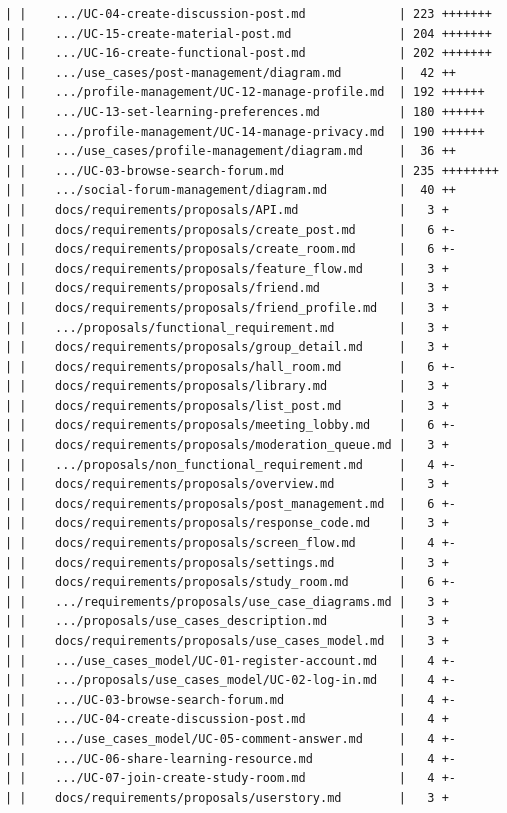 \documentclass[12pt]{article}
\begin{document}
\begin{lstlisting}[numbers=none,breaklines=true]
| |    .../UC-04-create-discussion-post.md             | 223 +++++++
| |    .../UC-15-create-material-post.md               | 204 +++++++
| |    .../UC-16-create-functional-post.md             | 202 +++++++
| |    .../use_cases/post-management/diagram.md        |  42 ++
| |    .../profile-management/UC-12-manage-profile.md  | 192 ++++++
| |    .../UC-13-set-learning-preferences.md           | 180 ++++++
| |    .../profile-management/UC-14-manage-privacy.md  | 190 ++++++
| |    .../use_cases/profile-management/diagram.md     |  36 ++
| |    .../UC-03-browse-search-forum.md                | 235 ++++++++
| |    .../social-forum-management/diagram.md          |  40 ++
| |    docs/requirements/proposals/API.md              |   3 +
| |    docs/requirements/proposals/create_post.md      |   6 +-
| |    docs/requirements/proposals/create_room.md      |   6 +-
| |    docs/requirements/proposals/feature_flow.md     |   3 +
| |    docs/requirements/proposals/friend.md           |   3 +
| |    docs/requirements/proposals/friend_profile.md   |   3 +
| |    .../proposals/functional_requirement.md         |   3 +
| |    docs/requirements/proposals/group_detail.md     |   3 +
| |    docs/requirements/proposals/hall_room.md        |   6 +-
| |    docs/requirements/proposals/library.md          |   3 +
| |    docs/requirements/proposals/list_post.md        |   3 +
| |    docs/requirements/proposals/meeting_lobby.md    |   6 +-
| |    docs/requirements/proposals/moderation_queue.md |   3 +
| |    .../proposals/non_functional_requirement.md     |   4 +-
| |    docs/requirements/proposals/overview.md         |   3 +
| |    docs/requirements/proposals/post_management.md  |   6 +-
| |    docs/requirements/proposals/response_code.md    |   3 +
| |    docs/requirements/proposals/screen_flow.md      |   4 +-
| |    docs/requirements/proposals/settings.md         |   3 +
| |    docs/requirements/proposals/study_room.md       |   6 +-
| |    .../requirements/proposals/use_case_diagrams.md |   3 +
| |    .../proposals/use_cases_description.md          |   3 +
| |    docs/requirements/proposals/use_cases_model.md  |   3 +
| |    .../use_cases_model/UC-01-register-account.md   |   4 +-
| |    .../proposals/use_cases_model/UC-02-log-in.md   |   4 +-
| |    .../UC-03-browse-search-forum.md                |   4 +-
| |    .../UC-04-create-discussion-post.md             |   4 +
| |    .../use_cases_model/UC-05-comment-answer.md     |   4 +-
| |    .../UC-06-share-learning-resource.md            |   4 +-
| |    .../UC-07-join-create-study-room.md             |   4 +-
| |    docs/requirements/proposals/userstory.md        |   3 +

\end{lstlisting}
\end{document}
